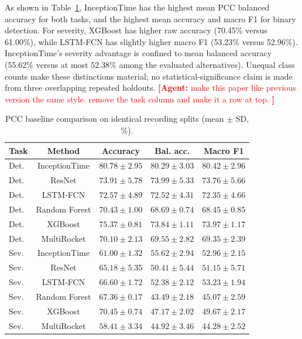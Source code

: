 \documentclass[letterpaper,journal]{IEEEtran}
\newcommand{\agent}[1]{%
    \textcolor{red}{\textbf{[Agent:} #1\textbf{]}}%
}
\begin{document}
As shown in Table~\ref{tab:model_comparison_hard_tasks}, InceptionTime has the highest mean PCC balanced accuracy for both tasks, and the highest mean accuracy and macro F1 for binary detection. For severity, XGBoost has higher raw accuracy (70.45\% versus 61.00\%), while LSTM-FCN has slightly higher macro F1 (53.23\% versus 52.96\%). InceptionTime's severity advantage is confined to mean balanced accuracy (55.62\% versus at most 52.38\% among the evaluated alternatives). Unequal class counts make these distinctions material; no statistical-significance claim is made from three overlapping repeated holdouts.
\agent{make this paper like previous version the same style. remove the task column and make it a row at top. }
\begin{table}[t]
\centering
\footnotesize
\caption{PCC baseline comparison on identical recording splits (mean $\pm$ SD, \%).}
\label{tab:model_comparison_hard_tasks}
\renewcommand{\arraystretch}{1.12}
\setlength{\tabcolsep}{3pt}
\begin{tabular}{lcccc}
\hline
Task & Method & Accuracy & Bal. acc. & Macro F1 \\
\hline
Det. & InceptionTime & $80.78\pm2.95$ & $80.29\pm3.03$ & $80.42\pm2.96$ \\
Det. & ResNet & $73.91\pm5.78$ & $73.99\pm5.33$ & $73.76\pm5.66$ \\
Det. & LSTM-FCN & $72.57\pm4.89$ & $72.52\pm4.31$ & $72.35\pm4.66$ \\
Det. & Random Forest & $70.43\pm1.00$ & $68.69\pm0.74$ & $68.45\pm0.85$ \\
Det. & XGBoost & $75.37\pm0.81$ & $73.84\pm1.11$ & $73.97\pm1.17$ \\
Det. & MultiRocket & $70.10\pm2.13$ & $69.55\pm2.82$ & $69.35\pm2.39$ \\
Sev. & InceptionTime & $61.00\pm1.32$ & $55.62\pm2.94$ & $52.96\pm2.15$ \\
Sev. & ResNet & $65.18\pm5.35$ & $50.41\pm5.44$ & $51.15\pm5.71$ \\
Sev. & LSTM-FCN & $66.60\pm1.72$ & $52.38\pm2.12$ & $53.23\pm1.94$ \\
Sev. & Random Forest & $67.36\pm0.17$ & $43.49\pm2.18$ & $45.07\pm2.59$ \\
Sev. & XGBoost & $70.45\pm0.74$ & $47.17\pm2.02$ & $49.67\pm2.17$ \\
Sev. & MultiRocket & $58.41\pm3.34$ & $44.92\pm3.46$ & $44.28\pm2.52$ \\
\hline
\end{tabular}

\end{table}
\end{document}
